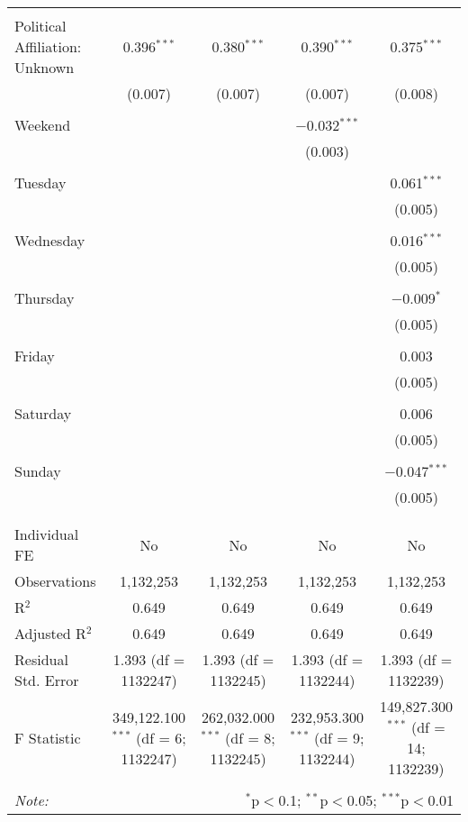 \documentclass[
]{article}
\begin{document}
\begin{table}[!htbp]
{\begin{tabular}{@{\extracolsep{5pt}}lcccc}
  & & & & \\ 
 Political Affiliation: Unknown & 0.396$^{***}$ & 0.380$^{***}$ & 0.390$^{***}$ & 0.375$^{***}$ \\ 
  & (0.007) & (0.007) & (0.007) & (0.008) \\ 
  & & & & \\ 
 Weekend &  &  & $-$0.032$^{***}$ &  \\ 
  &  &  & (0.003) &  \\ 
  & & & & \\ 
 Tuesday &  &  &  & 0.061$^{***}$ \\ 
  &  &  &  & (0.005) \\ 
  & & & & \\ 
 Wednesday &  &  &  & 0.016$^{***}$ \\ 
  &  &  &  & (0.005) \\ 
  & & & & \\ 
 Thursday &  &  &  & $-$0.009$^{*}$ \\ 
  &  &  &  & (0.005) \\ 
  & & & & \\ 
 Friday &  &  &  & 0.003 \\ 
  &  &  &  & (0.005) \\ 
  & & & & \\ 
 Saturday &  &  &  & 0.006 \\ 
  &  &  &  & (0.005) \\ 
  & & & & \\ 
 Sunday &  &  &  & $-$0.047$^{***}$ \\ 
  &  &  &  & (0.005) \\ 
  & & & & \\ 
\hline \\[-1.8ex] 
Individual FE & No & No & No & No \\ 
Observations & 1,132,253 & 1,132,253 & 1,132,253 & 1,132,253 \\ 
R$^{2}$ & 0.649 & 0.649 & 0.649 & 0.649 \\ 
Adjusted R$^{2}$ & 0.649 & 0.649 & 0.649 & 0.649 \\ 
Residual Std. Error & 1.393 (df = 1132247) & 1.393 (df = 1132245) & 1.393 (df = 1132244) & 1.393 (df = 1132239) \\ 
F Statistic & 349,122.100$^{***}$ (df = 6; 1132247) & 262,032.000$^{***}$ (df = 8; 1132245) & 232,953.300$^{***}$ (df = 9; 1132244) & 149,827.300$^{***}$ (df = 14; 1132239) \\ 
\hline 
\hline \\[-1.8ex] 
\textit{Note:}  & \multicolumn{4}{r}{$^{*}$p$<$0.1; $^{**}$p$<$0.05; $^{***}$p$<$0.01} \\ 
\end{tabular}
} 
\end{table} 
\newpage
\end{document}
